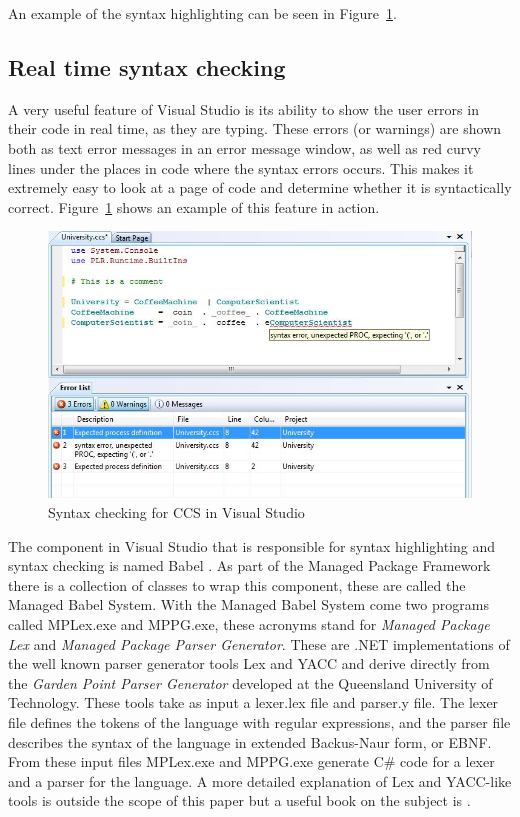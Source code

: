 	An example of the syntax highlighting can be seen in 
	Figure~\ref{fig:syntaxcheck}.
	
	\subsection{Real time syntax checking}\label{sec:syntax_checking}
	A very useful feature of Visual Studio is its ability to show the user 
	errors in their code in real time, as they are typing. These errors (or 
	warnings) are shown both as text error messages in an error message window, 
	as well as red curvy lines under the places in code where the syntax errors 
	occurs. This makes it extremely easy to look at a page of code and determine 
	whether it is syntactically correct. Figure~\ref{fig:syntaxcheck} shows an 
	example of this feature in action.
	
	\begin{figure}[h!]
		\centering
		\includegraphics[scale=0.7]{syntaxcheck.jpg}
		\caption{Syntax checking for CCS in Visual Studio}
		\label{fig:syntaxcheck}
	\end{figure}

	The component in Visual Studio that is responsible for syntax highlighting 
	and syntax checking is named Babel \cite{babel}. As part of the Managed 
	Package Framework there is a collection of classes to wrap this component, 
	these are called the Managed Babel System. With the Managed Babel System 
	come two programs called MPLex.exe and MPPG.exe, these acronyms stand for 
	\textit{Managed Package Lex} and \textit{Managed Package Parser Generator}. 
	These are .NET implementations of the well known parser generator tools Lex 
	and YACC and derive directly from the \textit{Garden Point Parser Generator} 
	\cite{gppg} developed at the Queensland University of Technology. These 
	tools take as input a \textsf{lexer.lex} file and \textsf{parser.y} file. 
	The lexer file defines the tokens of the language with regular expressions, 
	and the parser file describes the syntax of the language in extended 
	Backus-Naur form, or EBNF. From these input files MPLex.exe and MPPG.exe 
	generate C\# code for a lexer and a parser for the language. A more detailed 
	explanation of Lex and YACC-like tools is outside the scope of this paper 
	but a useful book on the subject is \cite{lexyacc}. 
	
